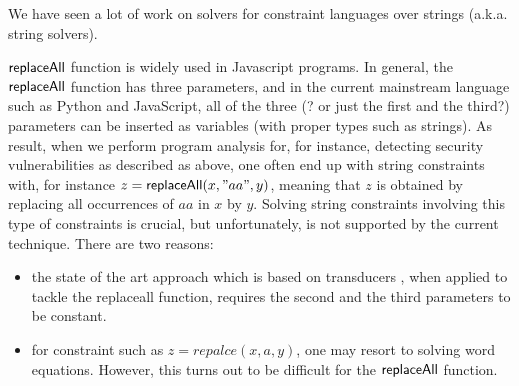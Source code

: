 


We have seen  a lot of work on solvers for constraint languages over strings (a.k.a. string solvers). 


$\mathsf{replaceAll}$ function is widely used in Javascript programs. In general, the $\mathsf{replaceAll}$ function has three parameters, and in the current mainstream language such as Python and JavaScript, all of the three (? or just the first and the third?) parameters can be inserted as variables (with proper types such as strings). As result, when we perform program analysis for, for instance, detecting security vulnerabilities as described as above, one often end up with string constraints with, for instance $z=\mathsf{replaceAll}(x,"aa", y)$, meaning that $z$ is obtained by replacing all occurrences of $aa$ in $x$ by $y$. Solving string constraints involving this type of constraints is crucial, but unfortunately, is not supported by the current technique. There are two reasons:
\begin{itemize}
	\item the state of the art approach which is based on transducers \cite{LB16}, when applied to tackle the replaceall function, requires the second and the third parameters to be constant. 
	
	\item for constraint such as $z=repalce(x,a,y)$, one may resort to solving word equations. However, this turns out to be difficult for the $\mathsf{replaceAll}$ function.   
\end{itemize}

